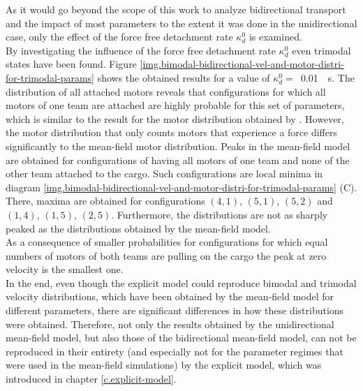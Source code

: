 As it would go beyond the scope of this work to analyze bidirectional transport and the impact of most parameters to the extent it was done in the unidirectional case, only the effect of the
force free detachment rate $\kappa_d^0$ is examined. \\
By investigating the influence of the force free detachment rate $\kappa_d^0$ even trimodal states have been found. Figure \ref{img.bimodal-bidirectional-vel-and-motor-distri-for-trimodal-params}
shows the obtained results for a value of \mbox{$\kappa_d^0 =$ \SI{0.01}{\per\second}}. The distribution of all attached motors reveals that configurations for which all motors of one team are 
attached are highly probable for this set of parameters, which is similar to the result for the motor distribution obtained by \cite{pnas105}. However, the motor distribution that only counts
motors that experience a force differs significantly to the mean-field motor distribution. Peaks in the mean-field model are obtained for configurations of having all motors of one team and none
of the other team attached to the cargo. Such configurations are local minima in diagram \ref{img.bimodal-bidirectional-vel-and-motor-distri-for-trimodal-params} (C). There, maxima are obtained for
configurations \mbox{$\left(4, 1\right)$}, \mbox{$\left(5, 1\right)$}, \mbox{$\left(5, 2\right)$} and \mbox{$\left(1, 4\right)$},
\mbox{$\left(1, 5\right)$}, \mbox{$\left(2, 5\right)$}. Furthermore, the distributions are not as sharply peaked as the distributions obtained by the mean-field model. \\
As a consequence of smaller probabilities for configurations for which equal numbers of motors of both teams are pulling on the cargo the peak at zero velocity is the smallest one. \\
In the end, even though the explicit model could reproduce bimodal and trimodal velocity distributions, which have been obtained by the mean-field model for different parameters, there are
significant differences in how these distributions were obtained. Therefore, not only the results obtained by the unidirectional mean-field model, but also those of the bidirectional mean-field
model, can not be reproduced in their entirety (and especially not for the parameter regimes that were used in the mean-field simulations) by the explicit model, which was introduced in chapter
\ref{c.explicit-model}.

